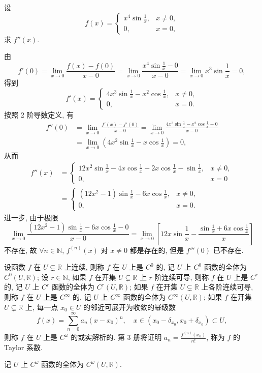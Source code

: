 \begin{example}\label{ex:3.2.6}
设
\[
f(x) = \begin{cases}x^{4}\sin\frac{1}{x}, & x \neq 0,\\ 0, & x = 0,\end{cases}
\]
求 $f''(x)$.
\end{example}

\begin{solution}
由
\[
f'(0) = \lim_{x\to0}\frac{f(x) - f(0)}{x - 0} = \lim_{x\to0}\frac{x^{4}\sin\frac{1}{x} - 0}{x - 0} = \lim_{x\to0}x^{3}\sin\frac{1}{x} = 0,
\]
得到
\[
f'(x) = \begin{cases}4x^{3}\sin\frac{1}{x} - x^{2}\cos\frac{1}{x}, & x \neq 0,\\ 0, & x = 0.\end{cases}
\]
按照 2 阶导数定义, 有
\[
\begin{aligned}
f''(0) &= \lim_{x\to0}\frac{f'(x) - f'(0)}{x - 0} = \lim_{x\to0}\frac{4x^{3}\sin\frac{1}{x} - x^{2}\cos\frac{1}{x} - 0}{x - 0}\\
&= \lim_{x\to0}\left(4x^{2}\sin\frac{1}{x} - x\cos\frac{1}{x}\right) = 0,
\end{aligned}
\]
从而
\[
\begin{aligned}
f''(x) &= \begin{cases}12x^{2}\sin\frac{1}{x} - 4x\cos\frac{1}{x} - 2x\cos\frac{1}{x} - \sin\frac{1}{x}, & x \neq 0,\\ 0, & x = 0\end{cases}\\
&= \begin{cases}(12x^{2} - 1)\sin\frac{1}{x} - 6x\cos\frac{1}{x}, & x \neq 0,\\ 0, & x = 0.\end{cases}
\end{aligned}
\]
进一步, 由于极限
\[
\lim_{x\to0}\frac{(12x^{2} - 1)\sin\frac{1}{x} - 6x\cos\frac{1}{x} - 0}{x - 0} = \lim_{x\to0}\left[12x\sin\frac{1}{x} - \frac{\sin\frac{1}{x} + 6x\cos\frac{1}{x}}{x}\right]
\]
不存在, 故 $\forall n \in \mathbb{N}$, $f^{(n)}(x)$ 对 $x \neq 0$ 都是存在的, 但是 $f'''(0)$ 已不存在.
\end{solution}

\begin{definition}\label{def:3.2.2}
设函数 $f$ 在 $U \subsetneq \mathbb{R}$ 上连续, 则称 $f$ 在 $U$ 上是 $C^{0}$ 的, 记 $U$ 上 $C^{0}$ 函数的全体为 $C^{0}(U, \mathbb{R})$; 设 $r \in \mathbb{N}$, 如果 $f$ 在开集 $U \subsetneq \mathbb{R}$ 上 $r$ 阶连续可导, 则称 $f$ 在 $U$ 上是 $C^{r}$ 的, 记 $U$ 上 $C^{r}$ 函数的全体为 $C^{r}(U, \mathbb{R})$; 如果 $f$ 在开集 $U \subsetneq \mathbb{R}$ 上各阶连续可导, 则称 $f$ 在 $U$ 上是 $C^{\infty}$ 的, 记 $U$ 上 $C^{\infty}$ 函数的全体为 $C^{\infty}(U, \mathbb{R})$; 如果 $f$ 在开集 $U \subsetneq \mathbb{R}$ 上, 每一点 $x_0 \in U$ 的邻近可展开为收敛的幂级数
\[
f(x) = \sum_{n=0}^{\infty}a_{n}(x-x_0)^{n},\quad x \in (x_0 - \delta_{x_0}, x_0 + \delta_{x_0}) \subset U,
\]
则称 $f$ 在 $U$ 上是 $C^{\omega}$ 的或实解析的. 第 3 册将证明 $a_{n} = \frac{f^{(n)}(x_0)}{n!}$, 称为 $f$ 的 Taylor 系数.

记 $U$ 上 $C^{\omega}$ 函数的全体为 $C^{\omega}(U, \mathbb{R})$.
\end{definition}

